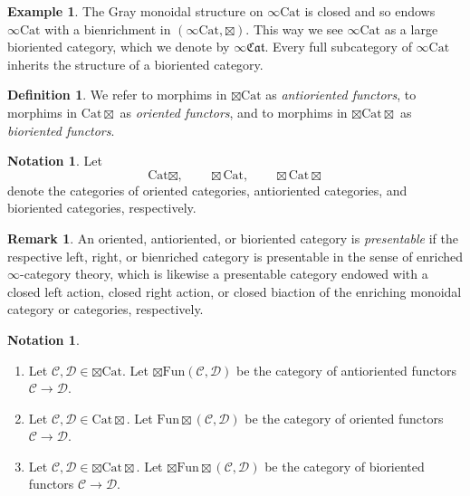 \documentclass[10pt,oneside]{article}
\numberwithin{equation}{section} %
\numberwithin{figure}{section} %
\theoremstyle{plain}
\theoremstyle{definition}
\newtheorem{definition}[theorem]{Definition}
\newtheorem{notation}[theorem]{Notation}
\newtheorem{remark}[theorem]{Remark}
\newtheorem{example}[theorem]{Example}
\newcommand{\mC}{{\mathcal C}}
\newcommand{\mD}{{\mathcal D}}
\newcommand{\Cat}{\mathrm{Cat}}
\newcommand{\Fun}{\mathrm{Fun}}
\newcommand{\fcat}{\mathfrak{Cat}}
\begin{document}
\begin{example}
The Gray monoidal structure on $\infty\Cat$ is closed and so endows $\infty\Cat$ with a bienrichment in $(\infty\Cat,\boxtimes).$ This way we see
$\infty\Cat$ as a large bioriented category, which we denote by $ \infty\fcat.$
Every full subcategory of $\infty\Cat$ inherits the structure of a bioriented category.

\end{example}	

\begin{definition}
We refer to morphims in $\boxtimes\Cat$ as {\em antioriented functors}, to morphims in $\Cat\boxtimes$ as {\em oriented functors}, and to morphims in $\boxtimes\Cat\boxtimes$ as {\em bioriented functors}.
\end{definition}

\begin{notation}

Let $$\Cat\boxtimes,\qquad \boxtimes\Cat, \qquad \boxtimes\Cat\boxtimes$$
denote the categories of oriented categories, antioriented categories, and bioriented categories, respectively.
\end{notation}




\begin{remark}
An oriented, antioriented, or bioriented category is {\em presentable} if the respective left, right, or bienriched category is presentable in the sense of enriched $\infty$-category theory, which is likewise a presentable category endowed with a closed left action, closed right action, or closed biaction of the enriching monoidal category or categories, respectively.
\end{remark}


\begin{notation}\emph{}
\begin{enumerate}[\normalfont(1)]\setlength{\itemsep}{-2pt}
\item Let $\mC,\mD \in \boxtimes\Cat$. Let ${\boxtimes\Fun}(\mC,\mD)$ be the category of antioriented functors $\mC \to \mD.$	
		
\item Let $\mC,\mD \in \Cat\boxtimes$. Let ${\Fun\boxtimes}(\mC,\mD)$ be the category of oriented functors $\mC \to \mD.$	
		
\item Let $\mC,\mD \in \boxtimes\Cat\boxtimes $. Let ${\boxtimes\Fun\boxtimes}(\mC,\mD)$ be the category of bioriented functors $\mC \to \mD.$		

\end{enumerate}
\end{notation}
\end{document}
